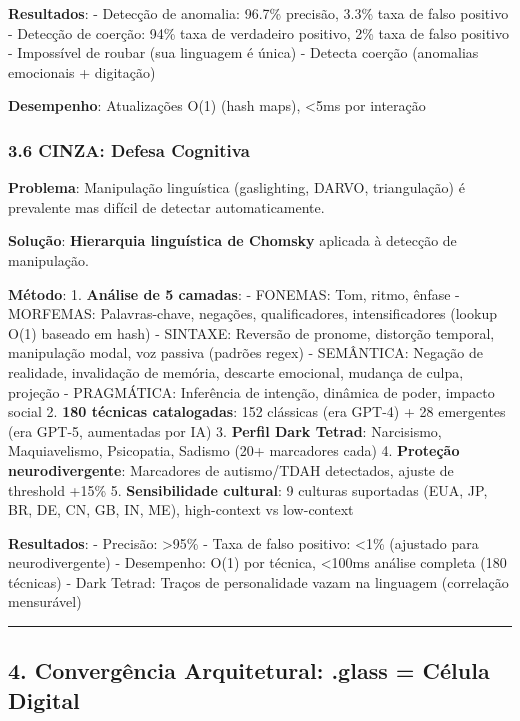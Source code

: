 \documentclass[
]{article}
\begin{document}
\textbf{Resultados}: - Detecção de anomalia: 96.7\% precisão, 3.3\% taxa
de falso positivo - Detecção de coerção: 94\% taxa de verdadeiro
positivo, 2\% taxa de falso positivo - Impossível de roubar (sua
linguagem é única) - Detecta coerção (anomalias emocionais + digitação)

\textbf{Desempenho}: Atualizações O(1) (hash maps), \textless5ms por
interação

\subsubsection{3.6 CINZA: Defesa
Cognitiva}\label{cinza-defesa-cognitiva}

\textbf{Problema}: Manipulação linguística (gaslighting, DARVO,
triangulação) é prevalente mas difícil de detectar automaticamente.

\textbf{Solução}: \textbf{Hierarquia linguística de Chomsky} aplicada à
detecção de manipulação.

\textbf{Método}: 1. \textbf{Análise de 5 camadas}: - FONEMAS: Tom,
ritmo, ênfase - MORFEMAS: Palavras-chave, negações, qualificadores,
intensificadores (lookup O(1) baseado em hash) - SINTAXE: Reversão de
pronome, distorção temporal, manipulação modal, voz passiva (padrões
regex) - SEMÂNTICA: Negação de realidade, invalidação de memória,
descarte emocional, mudança de culpa, projeção - PRAGMÁTICA: Inferência
de intenção, dinâmica de poder, impacto social 2. \textbf{180 técnicas
catalogadas}: 152 clássicas (era GPT-4) + 28 emergentes (era GPT-5,
aumentadas por IA) 3. \textbf{Perfil Dark Tetrad}: Narcisismo,
Maquiavelismo, Psicopatia, Sadismo (20+ marcadores cada) 4.
\textbf{Proteção neurodivergente}: Marcadores de autismo/TDAH
detectados, ajuste de threshold +15\% 5. \textbf{Sensibilidade
cultural}: 9 culturas suportadas (EUA, JP, BR, DE, CN, GB, IN, ME),
high-context vs low-context

\textbf{Resultados}: - Precisão: \textgreater95\% - Taxa de falso
positivo: \textless1\% (ajustado para neurodivergente) - Desempenho:
O(1) por técnica, \textless100ms análise completa (180 técnicas) - Dark
Tetrad: Traços de personalidade vazam na linguagem (correlação
mensurável)

\begin{center}\rule{0.5\linewidth}{0.5pt}\end{center}

\subsection{4. Convergência Arquitetural: .glass = Célula
Digital}\label{converguxeancia-arquitetural-.glass-cuxe9lula-digital}
\end{document}
